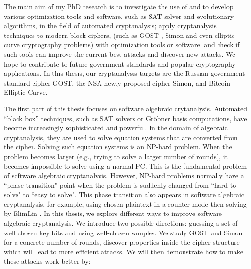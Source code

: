 The main aim of my PhD research is to investigate the use of and to develop various optimization tools and software, such as SAT solver and evolutionary algorithms, in the field of automated cryptanalysis; apply cryptanalysis techniques to modern block ciphers, (such as GOST \cite{gost198928147}, Simon \cite{NSAciphers} and even elliptic curve cryptography problems) with optimization tools or software; and check if such tools can improve the current best attacks and discover new attacks. We hope to contribute to future government standards and popular cryptography applications. In this thesis, our cryptanalysis targets are the Russian government standard cipher GOST, the NSA newly proposed cipher Simon, and Bitcoin Elliptic Curve.

The first part of this thesis focuses on software algebraic crytanalysis. Automated “black box” techniques, such as SAT solvers or Gr\"{o}bner basis computations, have become increasingly sophisticated and powerful. In the domain of algebraic cryptanalysis, they are used to solve equation systems that are converted from the cipher. Solving such equation systems is an NP-hard problem. When the problem becomes larger (e.g., trying to solve a larger number%
 of rounds), it becomes impossible to solve using a normal PC. This is the fundamental problem of software algebraic cryptanalysis. However, NP-hard problems normally have a ``phase transition" point when the problem is suddenly changed from ``hard to solve" to ``easy to solve". This phase transition also appears in software algebraic cryptanalysis, for example, using chosen plaintext in a counter mode then solving by ElimLin \cite{ElimLinR}. In this thesis, we explore different ways to improve software algebraic cryptanalysis. We introduce two possible directions: guessing a set of well chosen key bits and using well-chosen samples. We study GOST and Simon for a concrete number of rounds, discover properties inside the cipher structure which will lead to more efficient attacks. We will then demonstrate how to make these attacks work better by: %

